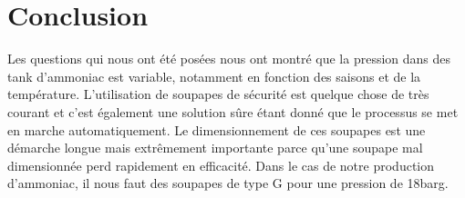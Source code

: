 \section{Conclusion}
Les questions qui nous ont été posées nous ont montré que la pression dans des tank d'ammoniac est variable, notamment en fonction des saisons et de la température. L'utilisation de soupapes de sécurité est quelque chose de très courant et c'est également une solution sûre étant donné que le processus se met en marche automatiquement. Le dimensionnement de ces soupapes est une démarche longue mais extrêmement importante parce qu'une soupape mal dimensionnée perd rapidement en efficacité. Dans le cas de notre production d'ammoniac, il nous faut des soupapes de type G pour une pression de \unit{18}{barg}.
